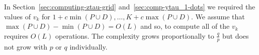 \documentclass[journal]{IEEEtranTCOM}
\begin{document}
In Section~\ref{sec:computing-ztau-grid} and~\ref{sec:comp-ytau_1-dots} we required the values of $v_k$ for $1 + c\min(P\cup D), \dots, K + c\max(P \cup D)$.  We assume that $\max(P \cup D) - \min(P \cup D) = O(L)$ and so, to compute all of the $v_k$ requires $O(L)$ operations.  The complexity grows proportionally to $\tfrac{q}{p}$ but does not grow with $p$ or $q$ individually.







\end{document}

